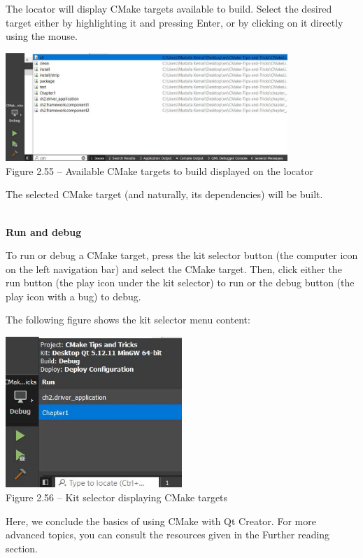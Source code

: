The locator will display CMake targets available to build. Select the desired target either by highlighting it and pressing Enter, or by clicking on it directly using the mouse.

\begin{center}
\includegraphics[width=0.8\textwidth]{content/1/chapter2/images/55.jpg}\\
Figure 2.55 – Available CMake targets to build displayed on the locator
\end{center}

The selected CMake target (and naturally, its dependencies) will be built.

\hspace*{\fill} \\ %
\noindent
\textbf{Run and debug}

To run or debug a CMake target, press the kit selector button (the computer icon on the left navigation bar) and select the CMake target. Then, click either the run button (the play icon under the kit selector) to run or the debug button (the play icon with a bug) to debug.

The following figure shows the kit selector menu content:

\begin{center}
\includegraphics[width=0.5\textwidth]{content/1/chapter2/images/56.jpg}\\
Figure 2.56 – Kit selector displaying CMake targets
\end{center}

Here, we conclude the basics of using CMake with Qt Creator. For more advanced topics, you can consult the resources given in the Further reading section.

















